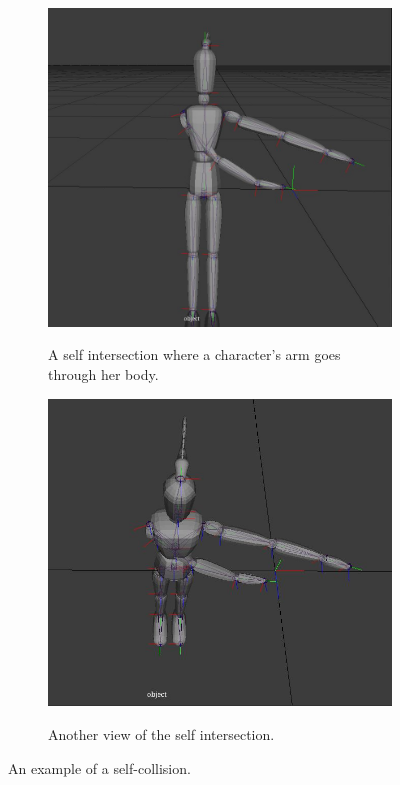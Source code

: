 \begin{figure}[h!]
	\centering
        \begin{subfigure}[b!]{0.45\textwidth}
        	\centering
                \includegraphics[width=\linewidth]{img/selfintersection}
                \label{fig:self}
                \caption{A self intersection where a character's arm goes through her body.}
        \end{subfigure}
        \quad
        \begin{subfigure}[b!]{0.45\textwidth}
        	\centering
                \includegraphics[width=\linewidth]{img/selfintersection1}
                \label{fig:self1}
                \caption{Another view of the self intersection.}
        \end{subfigure}%
        \caption{An example of a self-collision.}
	\label{fig:selfcollisions}
\end{figure}

